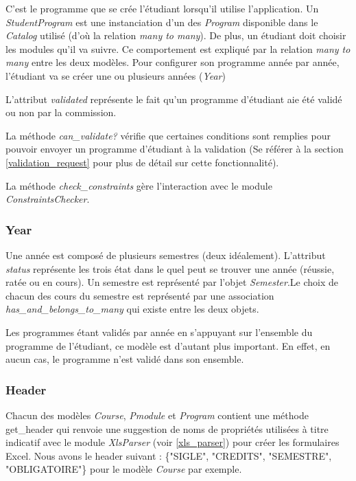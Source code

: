 C'est le programme que se crée l'étudiant lorsqu'il utilise l'application. Un \textit{StudentProgram} est une instanciation d'un des \textit{Program} disponible dans le \textit{Catalog} utilisé (d'où la relation \textit{many to many}). De plus, un étudiant doit choisir les modules qu'il va suivre. Ce comportement est expliqué par la relation \textit{many to many} entre les deux modèles. Pour configurer son programme année par année, l'étudiant va se créer une ou plusieurs années (\textit{Year})

L'attribut \textit{validated} représente le fait qu'un programme d'étudiant aie été validé ou non par la commission.

La méthode \textit{can\_validate?} vérifie que certaines conditions sont remplies pour pouvoir envoyer un programme d'étudiant à la validation (Se référer à la section \ref{validation_request} pour plus de détail sur cette fonctionnalité).

La méthode \textit{check\_constraints} gère l’interaction avec le module \textit{ConstraintsChecker}. 

\subsubsection{Year}

Une année est composé de plusieurs semestres (deux idéalement). L'attribut \textit{status} représente les trois état dans le quel peut se trouver une année (réussie, ratée ou en cours). Un semestre est représenté par l'objet \textit{Semester}.Le choix de chacun des cours du semestre est représenté par une association \textit{has\_and\_belongs\_to\_many} qui existe entre les deux objets.

Les programmes étant validés par année en s'appuyant sur l'ensemble du programme de l'étudiant, ce modèle est d'autant plus important. En effet, en aucun cas, le programme n'est validé dans son ensemble. 

\subsubsection{Header}

Chacun des modèles \textit{Course}, \textit{Pmodule} et \textit{Program} contient une méthode get\_header qui renvoie une suggestion de noms de propriétés utilisées à titre indicatif avec le module \textit{XlsParser} (voir \ref{xls_parser}) pour créer les formulaires Excel. Nous avons le header suivant : \{"SIGLE", "CREDITS", "SEMESTRE", "OBLIGATOIRE"\} pour le modèle \textit{Course} par exemple.

